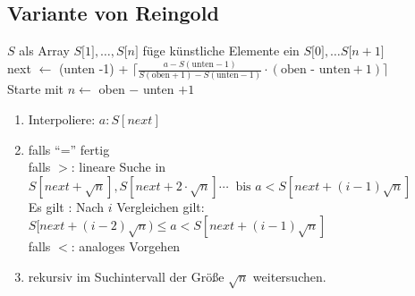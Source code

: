         \subsection{Variante von Reingold}
            $S$ als Array $S\lbrack 1 \rbrack, \ldots, S \lbrack
            n \rbrack$ füge künstliche Elemente ein $S \lbrack 0 \rbrack, \ldots S
            \lbrack n+1 \rbrack$ \\
            next $\leftarrow$ (unten -1) + $\lceil \frac{a-S(\text{unten}
            -1)}{S(\text{oben} +1) - S (\text{unten}-1)} \cdot (\text{oben - unten} + 1) \rceil$ \\
            Starte mit $n \leftarrow$ oben $-$ unten $+1$\\
            \begin{enumerate}[(1)]
                \item
                Interpoliere: $a : S[next]$ 
                \item 
                falls ``='' fertig \\
                falls $>$: lineare Suche in $S[next+\sqrt{n}], S[next+2 \cdot \sqrt{n}] \cdots \ \text{ bis } a < S[next+(i-1)\sqrt{n}]$ \\
                Es gilt : Nach $i$ Vergleichen gilt: $S[next+(i-2)\sqrt{n}) \leq a < S[next+(i-1)\sqrt{n}]$ \\
                falls $<$: analoges Vorgehen
                \item
                rekursiv im Suchintervall der Größe $\sqrt{n}$ weitersuchen. \\
            \end{enumerate}
        
